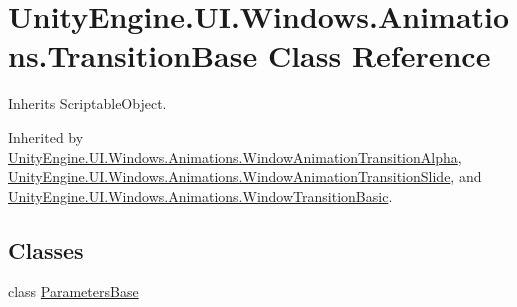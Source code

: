 \hypertarget{class_unity_engine_1_1_u_i_1_1_windows_1_1_animations_1_1_transition_base}{}\section{Unity\+Engine.\+U\+I.\+Windows.\+Animations.\+Transition\+Base Class Reference}
\label{class_unity_engine_1_1_u_i_1_1_windows_1_1_animations_1_1_transition_base}


Inherits Scriptable\+Object.



Inherited by \hyperlink{class_unity_engine_1_1_u_i_1_1_windows_1_1_animations_1_1_window_animation_transition_alpha}{Unity\+Engine.\+U\+I.\+Windows.\+Animations.\+Window\+Animation\+Transition\+Alpha}, \hyperlink{class_unity_engine_1_1_u_i_1_1_windows_1_1_animations_1_1_window_animation_transition_slide}{Unity\+Engine.\+U\+I.\+Windows.\+Animations.\+Window\+Animation\+Transition\+Slide}, and \hyperlink{class_unity_engine_1_1_u_i_1_1_windows_1_1_animations_1_1_window_transition_basic}{Unity\+Engine.\+U\+I.\+Windows.\+Animations.\+Window\+Transition\+Basic}.

\subsection*{Classes}
\begin{DoxyCompactItemize}
\item 
class \hyperlink{class_unity_engine_1_1_u_i_1_1_windows_1_1_animations_1_1_transition_base_1_1_parameters_base}{Parameters\+Base}
\end{DoxyCompactItemize}
